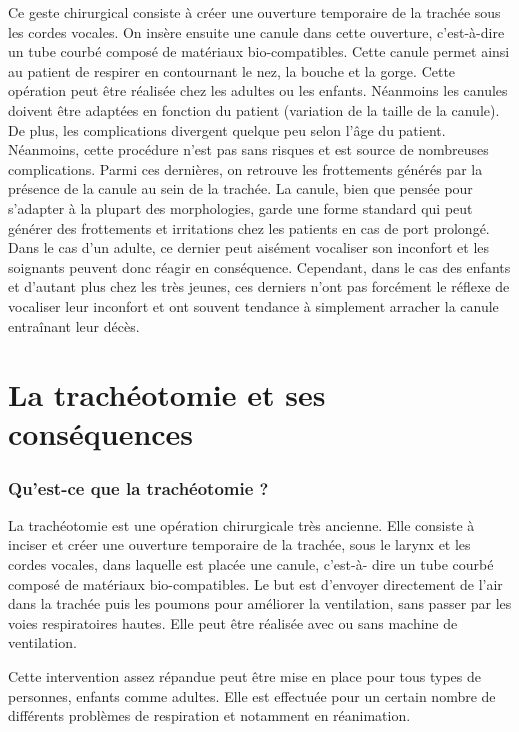 \documentclass [11pt]{article}
\begin{document}
\par Ce geste chirurgical consiste à créer une ouverture temporaire de la trachée sous les cordes vocales. On insère ensuite une canule dans cette ouverture, c’est-à-dire un  tube courbé composé de matériaux bio-compatibles. Cette canule permet ainsi au patient de respirer en contournant le nez, la bouche et la gorge. Cette opération peut être réalisée chez les adultes ou les enfants. Néanmoins les canules doivent être adaptées en fonction du patient (variation de la taille de la canule). De plus, les complications divergent quelque peu selon l’âge du patient.  \\

Néanmoins, cette procédure n’est pas sans risques et est source de nombreuses complications. Parmi ces dernières, on retrouve les frottements générés par la présence de la canule au sein de la trachée. La canule, bien que pensée pour s’adapter à la plupart des morphologies, garde une forme standard qui peut générer des frottements et irritations chez les patients en cas de port prolongé. Dans le cas d’un adulte, ce dernier peut aisément vocaliser son inconfort et les soignants peuvent donc réagir en conséquence. Cependant, dans le cas des enfants et d’autant plus chez les très jeunes, ces derniers n’ont pas forcément le réflexe de vocaliser leur inconfort et ont souvent tendance à simplement arracher la canule entraînant leur décès. \\


\newpage
\part{La trachéotomie et ses conséquences}
\section{Qu'est-ce que la trachéotomie ?}

La trachéotomie est une opération chirurgicale très ancienne. Elle consiste à inciser et créer une ouverture temporaire de la trachée, sous le larynx et les cordes vocales, dans laquelle est placée une canule, c'est-à- dire un tube courbé composé de matériaux bio-compatibles. Le but est d'envoyer directement de l'air dans la trachée puis les poumons pour améliorer la ventilation, sans passer par les voies respiratoires hautes. Elle peut être réalisée avec ou sans machine de ventilation.

Cette intervention assez répandue peut être mise en place pour tous types de personnes, enfants comme adultes. Elle est effectuée pour un certain nombre de différents problèmes de respiration et notamment en réanimation. 
\end{document}
